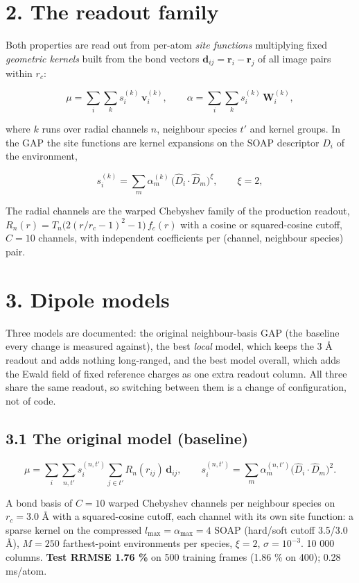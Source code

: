 \documentclass[11pt,a4paper]{article}
\begin{document}
\section{2. The readout family}\label{the-readout-family}

Both properties are read out from per-atom \emph{site functions} multiplying fixed \emph{geometric
kernels} built from the bond vectors \(\mathbf d_{ij} = \mathbf r_i-\mathbf r_j\) of all image pairs
within \(r_c\):

\[
\mu = \sum_i \sum_k s^{(k)}_i\, \mathbf v^{(k)}_i, \qquad
\alpha = \sum_i \sum_k s^{(k)}_i\, \mathbf W^{(k)}_i ,
\]

where \(k\) runs over radial channels \(n\), neighbour species \(t'\) and kernel groups. In the GAP
the site functions are kernel expansions on the SOAP descriptor \(D_i\) of the environment,

\[
s^{(k)}_i = \sum_m \alpha^{(k)}_m\,\big(\hat D_i\cdot\hat D_m\big)^{\xi}, \qquad \xi = 2,
\]

The radial channels are the warped Chebyshev family of the production readout,
\(R_n(r) = T_n\!\big(2(r/r_c-1)^2-1\big)\,f_c(r)\) with a cosine or squared-cosine cutoff,
\(C = 10\) channels, with independent coefficients per (channel, neighbour species) pair.

\section{3. Dipole models}\label{dipole-models}

Three models are documented: the original neighbour-basis GAP (the baseline every change is measured
against), the best \emph{local} model, which keeps the 3 \AA{} readout and adds nothing long-ranged,
and the best model overall, which adds the Ewald field of fixed reference charges as one extra
readout column. All three share the same readout, so switching between them is a change of
configuration, not of code.

\subsection{3.1 The original model (baseline)}\label{the-original-model-baseline}

\[
\mu=\sum_i\sum_{n,t'} s^{(n,t')}_i\sum_{j\in t'}R_n(r_{ij})\,\mathbf d_{ij},
\qquad
s^{(n,t')}_i=\sum_m\alpha^{(n,t')}_m\big(\hat D_i\cdot\hat D_m\big)^2 .
\]

A bond basis of \(C=10\) warped Chebyshev channels per neighbour species on \(r_c=3.0\) \AA{} with a
squared-cosine cutoff, each channel with its own site function: a sparse kernel on the compressed
\(l_{\max}=\alpha_{\max}=4\) SOAP (hard/soft cutoff 3.5/3.0 \AA{}), \(M=250\) farthest-point
environments per species, \(\xi=2\), \(\sigma=10^{-3}\). 10 000 columns. \textbf{Test RRMSE 1.76 \%}
on 500 training frames (1.86 \% on 400); 0.28 ms/atom.
\end{document}
